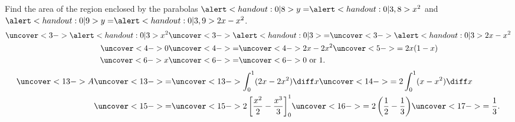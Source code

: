 \begin{frame}
\begin{example}[Example 2, p. 433]
\begin{columns}
Find the area of the region enclosed by the parabolas $\alert<handout:0| 8>{y =} \alert<handout:0| 3,8>{x^2}$ and $\alert<handout:0| 9>{y =} \alert<handout:0| 3,9>{2x - x^2}$.
\abovedisplayskip=0pt
\belowdisplayskip=0pt
\abovedisplayshortskip=0pt
\belowdisplayshortskip=0pt
\begin{align*}
\uncover<3->{\alert<handout:0| 3>{x^2}} & \uncover<3->{\alert<handout:0| 3>{=}}  \uncover<3->{\alert<handout:0| 3>{2x - x^2}} \\
\uncover<4->{0} & \uncover<4->{=}  \uncover<4->{2x - 2x^2} \uncover<5->{ = 2x(1 - x)} \\
\uncover<6->{x} & \uncover<6->{=}  \uncover<6->{0 \text{ or } 1.}
\end{align*}
\begin{align*}
\uncover<13->{A} & \uncover<13->{=}  \uncover<13->{\int_0^1 (2x - 2x^2) \diff x} \uncover<14->{ = 2\int_0^1 (x - x^2) \diff x} \\
 & \uncover<15->{=}  \uncover<15->{2\left[ \frac{x^2}{2} - \frac{x^3}{3}\right]_0^1} \uncover<16->{ = 2\left( \frac{1}{2} - \frac{1}{3}\right)} \uncover<17->{ = \frac{1}{3}.}
\end{align*}
\end{columns}
\end{example}
\end{frame}
